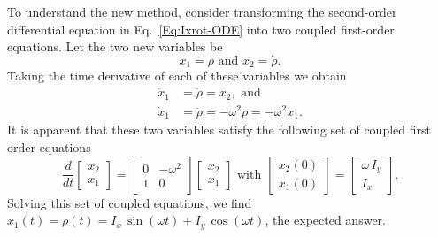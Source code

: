 To understand the new method, consider transforming the second-order differential equation in Eq.~\ref{Eq:Ixrot-ODE} into two coupled first-order equations.  Let the two new variables be 
\begin{equation}
x_1 = \rho \text{ and } x_2 = \dot{\rho}.
\end{equation}
Taking the time derivative of each of these variables we obtain 
\begin{subequations}
\begin{align}
\dot{x}_1 & = \dot{\rho} = x_2, \text{ and} \\
\dot{x}_1 & = \ddot{\rho} = - \omega^2 \rho = - \omega^2 x_1.
\end{align}
\end{subequations}
It is apparent that these two variables satisfy the following set of coupled first order equations
\begin{equation}
\frac{d}{dt} \begin{bmatrix} x_2 \\ x_1 \end{bmatrix}
	= \begin{bmatrix} 0 & - \omega^2 \\ 1 & 0 \end{bmatrix}
	  \begin{bmatrix} x_2 \\ x_1 \end{bmatrix}
\text{ with } 
\begin{bmatrix} x_2(0) \\ x_1(0) \end{bmatrix}
	=
	\begin{bmatrix} \omega \, I_{y} \\ I_{x} \end{bmatrix}. \label{Eq:Ixrot-2x2}
\end{equation}
Solving this set of coupled equations, we find $x_1(t) = \rho(t) = I_x \, \sin{(\omega t)} + I_y \, \cos{(\omega t)}$, the expected answer.  

